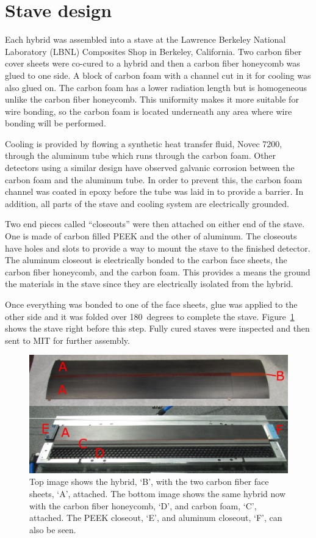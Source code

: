 \documentclass[preprint,12pt]{elsarticle}
\begin{document}
\section{Stave design}
Each hybrid was assembled into a stave at the Lawrence Berkeley National Laboratory (LBNL) Composites Shop in Berkeley,
California. Two carbon fiber cover sheets were co-cured to a hybrid and then a
carbon fiber honeycomb was glued to one side. A block of carbon foam with a
channel cut in it for cooling was also glued on. The carbon foam has a lower
radiation length but is homogeneous unlike the carbon fiber honeycomb. This
uniformity makes it more suitable for wire bonding, so the carbon foam is
located underneath any area where wire bonding will be performed.

Cooling is provided by flowing a synthetic heat transfer fluid, Novec 7200,
through the aluminum tube which runs through the carbon
foam. Other detectors using a similar design have observed galvanic corrosion
between the carbon foam and the aluminum tube. In order to prevent this, the
carbon foam channel was coated in epoxy before the tube was laid in to provide a
barrier. In addition, all parts of the stave and cooling system are
electrically grounded.

Two end pieces called ``closeouts'' were then attached on either end of the stave. One
is made of carbon filled PEEK and the other of aluminum. The closeouts have
holes and slots to provide a way to mount the stave to the finished detector. The
aluminum closeout is electrically bonded to the carbon face sheets, the carbon
fiber honeycomb, and the carbon foam. This provides a means the ground the
materials in the stave since they are electrically isolated from the hybrid.

Once everything was bonded to one of the face sheets, glue was applied to
the other side and it was folded over 180~degrees to complete the stave.
Figure~\ref{fig:stave_assmb} shows the stave right before this step. Fully
cured staves were inspected and then sent to MIT for further assembly.

\begin{figure}[h]
\begin{center}
\includegraphics[width=5.5in, keepaspectratio=true, angle=0]{graphics/stave_assmb.png}
\caption{Top image shows the hybrid, `B', with the two carbon fiber face sheets, `A', attached.
The bottom image shows the same hybrid now with the carbon fiber honeycomb, `D', and 
carbon foam, `C', attached. The PEEK closeout, `E', and aluminum closeout, `F', can also be seen.
\label{fig:stave_assmb}}
\end{center}
\end{figure}
%
\end{document}
